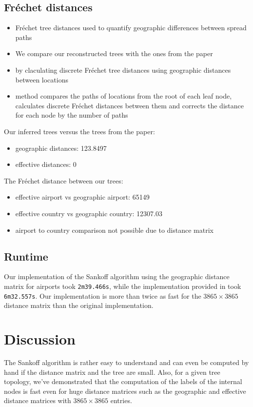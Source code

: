 \documentclass{article}
\begin{document}
\subsection{Fr\'{e}chet distances}
\begin{itemize}
    \item Fr\'{e}chet tree distances used to quantify geographic differences between spread paths
    \item We compare our reconstructed trees with the ones from the paper
    \item by claculating discrete Fr\'{e}chet tree distances using geographic distances between locations
    \item method compares the paths of locations from the root of each leaf node, calculates discrete Fr\'{e}chet distances between them and corrects the distance for each node by the number of paths
\end{itemize}

Our inferred trees versus the trees from the paper:
\begin{itemize}
    \item geographic distances: 123.8497
    \item effective distances: 0
\end{itemize}

The Fr\'{e}chet distance between our trees:
\begin{itemize}
    \item effective airport vs geographic airport: 65149
    \item effective country vs geographic country: 12307.03
    \item airport to country comparison not possible due to distance matrix
\end{itemize}

\subsection{Runtime}
Our implementation of the Sankoff algorithm using the geographic distance
matrix for airports took \texttt{2m39.466s}, while the implementation provided in
\cite{reimeringPhylogeographicReconstructionUsing2020} took \texttt{6m32.557s}.
Our implementation is more than twice as fast for the $3865 \times 3865$
distance matrix than the original implementation.


\section{Discussion}
The Sankoff algorithm is rather easy to understand and can even be computed by
hand if the distance matrix and the tree are small. Also, for a given tree
topology, we've demonstrated that the computation of the labels of the internal
nodes is fast even for huge distance matrices such as the geographic and
effective distance matrices with $3865 \times 3865$ entries.
\end{document}

